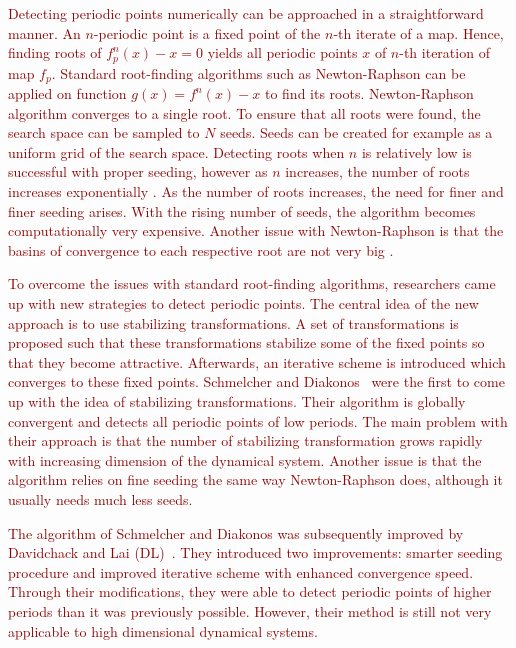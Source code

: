 \textcolor{darkred}{
Detecting periodic points numerically can be approached in a straightforward manner.
An $n$-periodic point is a fixed point of the $n$-th iterate of a map.
Hence, finding roots of $f^{n}_{p}(x)-x = 0$ yields all periodic points $x$ of $n$-th iteration of map $f_{p}$.
Standard root-finding algorithms such as Newton-Raphson can be applied on function $g(x) = f^{n}(x)-x$ to find its roots.
Newton-Raphson algorithm converges to a single root. To ensure that all roots were found, the search space can be sampled to $N$ seeds.
Seeds can be created for example as a uniform grid of the search space.
Detecting roots when $n$ is relatively low is successful with proper seeding, however as $n$ increases, the number of roots increases exponentially \cite{Davidchack1999}.
As the number of roots increases, the need for finer and finer seeding arises.
With the rising number of seeds, the algorithm becomes computationally very expensive.
Another issue with Newton-Raphson is that the basins of convergence to each respective root are not very big \cite{Davidchack1999}.
}
\par
\textcolor{darkred}{
To overcome the issues with standard root-finding algorithms, researchers came up with new strategies to detect periodic points.
The central idea of the new approach is to use stabilizing transformations.
A set of transformations is proposed such that these transformations stabilize some of the fixed points so that they become attractive.
Afterwards, an iterative scheme is introduced which converges to these fixed points.
Schmelcher and Diakonos~\cite{Schmelcher1997,Pingel2000, Pingel2001} were the first to come up with the idea of stabilizing transformations.
Their algorithm is globally convergent and detects all periodic points of low periods.
The main problem with their approach is that the number of stabilizing transformation grows rapidly with increasing dimension of the dynamical system.
Another issue is that the algorithm relies on fine seeding the same way Newton-Raphson does, although it usually needs much less seeds.
}
\par
\textcolor{darkred}{
The algorithm of Schmelcher and Diakonos was subsequently improved by Davidchack and Lai (DL)~\cite{Davidchack1999, Davidchack2001, Klebanoff2001}.
They introduced two improvements: smarter seeding procedure and improved iterative scheme with enhanced convergence speed.
Through their modifications, they were able to detect periodic points of higher periods than it was previously possible.
However, their method is still not very applicable to high dimensional dynamical systems.
}
